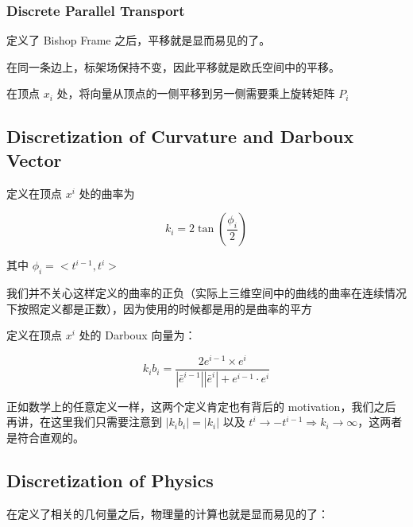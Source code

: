 \documentclass{notes}
\begin{document}
\subsubsection{Discrete Parallel Transport}

定义了 Bishop Frame 之后，平移就是显而易见的了。

在同一条边上，标架场保持不变，因此平移就是欧氏空间中的平移。

在顶点 $x_i$ 处，将向量从顶点的一侧平移到另一侧需要乘上旋转矩阵 $P_i$

\subsection{Discretization of Curvature and Darboux Vector}

\begin{definition}
	定义在顶点 $x^i$ 处的曲率为
	
	\begin{equation}\label{eq:discurvature}	
		k_i = 2 \tan (\frac{\phi_i}{2})
	\end{equation}

	其中 $\phi_i = <t^{i - 1}, t^i>$
\end{definition}

\begin{remark}
	我们并不关心这样定义的曲率的正负（实际上三维空间中的曲线的曲率在连续情况下按照定义都是正数），因为使用的时候都是用的是曲率的平方
\end{remark}

\begin{definition}
	定义在顶点 $x^i$ 处的 Darboux 向量为：

	\begin{equation}\label{eq:disdarboux}
		k_ib_i = \frac{2e^{i - 1} \times e^i}{\left|\bar{e}^{i - 1}\right|\left|\bar{e}^i\right| + e^{i - 1} \cdot e^i} 
	\end{equation}
\end{definition}

正如数学上的任意定义一样，这两个定义肯定也有背后的 motivation，我们之后再讲，在这里我们只需要注意到 $\left|k_ib_i\right| = \left|k_i\right|$ 以及 $t^{i} \rightarrow - t^{i - 1} \Rightarrow k_i \rightarrow \infty$，这两者是符合直观的。

\subsection{Discretization of Physics}

在定义了相关的几何量之后，物理量的计算也就是显而易见的了：
\end{document}
